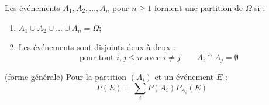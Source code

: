 \documentclass[main.tex]{subfiles}
\begin{document}
 
\begin{definition} 
	Les événements $A_1, A_2, ..., A_n$ pour $n \geqslant 1$ forment une partition de  $\Omega$  si   : 
	\begin{enumerate}[label=\textbullet, leftmargin=*]
		\item $A_1 \cup A_2 \cup ... \cup A_n = \Omega$;
		\item Les événements sont disjoints deux à deux : 
		\setlength{\abovedisplayskip}{3pt}
		\setlength{\belowdisplayskip}{3pt}
		$$ \text{pour tout $i,j \leqslant n$ avec $i\neq j$} \qquad A_i\cap A_j=\emptyset
		$$
	\end{enumerate}
\end{definition} 
\begin{proposition} (forme générale) Pour la partition $(A_i)$ et un événement $E$ :
	\setlength{\abovedisplayskip}{3pt}
	\setlength{\belowdisplayskip}{3pt}
	$$
	P(E)=\sum_i P(A_i) P_{A_i}(E)
	$$
\end{proposition}
\end{document}
